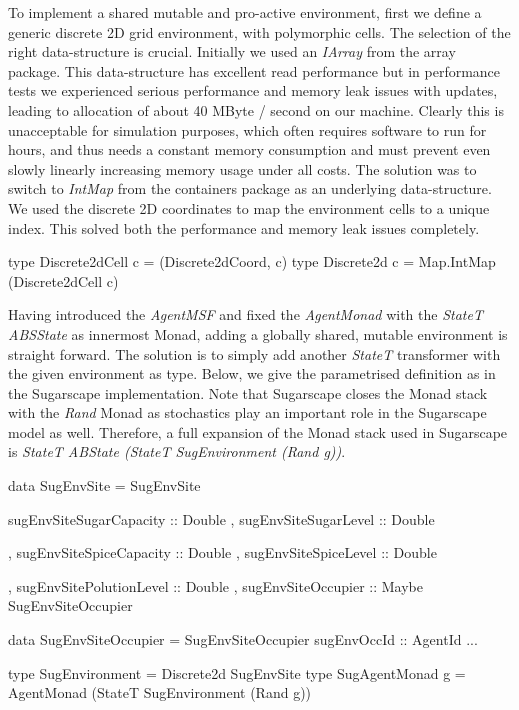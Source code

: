 To implement a shared mutable and pro-active environment, first we define a generic discrete 2D grid environment, with polymorphic cells. The selection of the right data-structure is crucial. Initially we used an \textit{IArray} from the array package. This data-structure has excellent read performance but in performance tests we experienced serious performance and memory leak issues with updates, leading to allocation of about 40 MByte / second on our machine. Clearly this is unacceptable for simulation purposes, which often requires software to run for hours, and thus needs a constant memory consumption and must prevent even slowly linearly increasing memory usage under all costs. The solution was to switch to \textit{IntMap} from the containers package as an underlying data-structure. We used the discrete 2D coordinates to map the environment cells to a unique index. This solved both the performance and memory leak issues completely.

\begin{HaskellCode}
type Discrete2dCell c = (Discrete2dCoord, c)
type Discrete2d c     = Map.IntMap (Discrete2dCell c)
\end{HaskellCode}

Having introduced the \textit{AgentMSF} and fixed the \textit{AgentMonad} with the \textit{StateT ABSState} as innermost Monad, adding a globally shared, mutable environment is straight forward. The solution is to simply add another \textit{StateT} transformer with the given environment as type. Below, we give the parametrised definition as in the Sugarscape implementation. Note that Sugarscape closes the Monad stack with the \textit{Rand} Monad as stochastics play an important role in the Sugarscape model as well. Therefore, a full expansion of the Monad stack used in Sugarscape is  \textit{StateT ABState (StateT SugEnvironment (Rand g))}.

\begin{HaskellCode}
data SugEnvSite = SugEnvSite 
  { sugEnvSiteSugarCapacity :: Double
  , sugEnvSiteSugarLevel    :: Double

  , sugEnvSiteSpiceCapacity :: Double
  , sugEnvSiteSpiceLevel    :: Double

  , sugEnvSitePolutionLevel :: Double
  , sugEnvSiteOccupier      :: Maybe SugEnvSiteOccupier
  }
  
data SugEnvSiteOccupier = SugEnvSiteOccupier 
  { sugEnvOccId :: AgentId
  ...
  }

type SugEnvironment  = Discrete2d SugEnvSite
type SugAgentMonad g = AgentMonad (StateT SugEnvironment (Rand g))
\end{HaskellCode}

